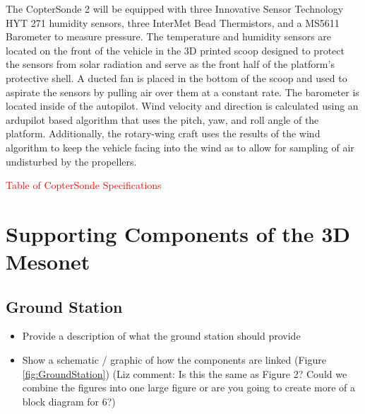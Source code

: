 \documentclass[sensors,review,submit,moreauthors,pdftex,10pt,a4paper]{mdpi}
\theoremstyle{mdpi}
\newcounter{thm}
\newcounter{ex}
\newcounter{re}
\theoremstyle{mdpidefinition}
\begin{document}
The CopterSonde 2 will be equipped with three Innovative Sensor Technology HYT 271 humidity sensors, three InterMet Bead Thermistors, and a MS5611 Barometer to measure pressure. The temperature and humidity sensors are located on the front of the vehicle in the 3D printed scoop designed to protect the sensors from solar radiation and serve as the front half of the platform's protective shell. A ducted fan is placed in the bottom of the scoop and used to aspirate the sensors by pulling air over them at a constant rate. The barometer is located inside of the autopilot. Wind velocity and direction is calculated using an ardupilot based algorithm that uses the pitch, yaw, and roll angle of the platform. Additionally, the rotary-wing craft uses the results of the wind algorithm to keep the vehicle facing into the wind as to allow for sampling of air undisturbed by the propellers. 

\textcolor{red}{Table of CopterSonde Specifications}


\section{Supporting Components of the 3D Mesonet}

\subsection{Ground Station}
\begin{itemize}[leftmargin=*,labelsep=4mm]
\color{blue}
\item	Provide a description of what the ground station should provide
\item	Show a schematic / graphic of how the components are linked (Figure \ref{fig:GroundStation}) (Liz comment: Is this the same as Figure 2? Could we combine the figures into one large figure or are you going to create more of a block diagram for 6?)
\end{itemize}
\end{document}
